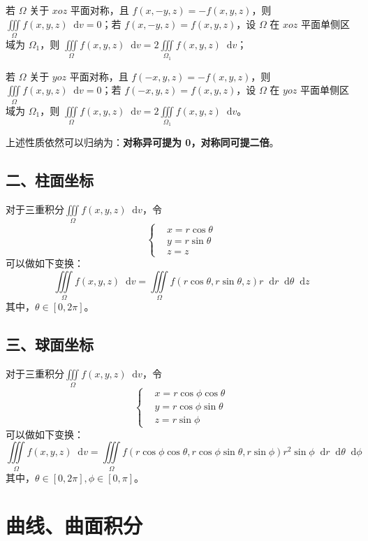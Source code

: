\documentclass[b5paper]{ctexart}
\renewcommand{\d}{\mathop{}\!\mathrm{d}}
\begin{document}
	若 $\Omega$ 关于 $xoz$ 平面对称，且 $f(x, -y, z) = -f(x, y, z)$，则 $\iiint \limits_{\Omega} f(x, y, z) \d v = 0$；若 $f(x, -y, z) = f(x, y, z)$，设 $\Omega$ 在 $xoz$ 平面单侧区域为 $\Omega_1$，则 $\iiint \limits_{\Omega} f(x, y, z) \d v = 2 \iiint \limits_{\Omega_1} f(x, y, z) \d v$；
	
	若 $\Omega$ 关于 $yoz$ 平面对称，且 $f(-x, y, z) = -f(x, y, z)$，则 $\iiint \limits_{\Omega} f(x, y, z) \d v = 0$；若 $f(-x, y, z) = f(x, y, z)$，设 $\Omega$ 在 $yoz$ 平面单侧区域为 $\Omega_1$，则 $\iiint \limits_{\Omega} f(x, y, z) \d v = 2 \iiint \limits_{\Omega_1} f(x, y, z) \d v$。
	
	上述性质依然可以归纳为：\textbf{对称异可提为 0，对称同可提二倍}。
	
	\subsection*{二、柱面坐标}
	对于三重积分$\iiint \limits_{\Omega} f(x, y, z) \d v$，令
	\[
		\left\{
		\begin{aligned}
			& x = r \cos \theta \\
			& y = r \sin \theta \\
			& z = z
		\end{aligned}
		\right.
	\]
	可以做如下变换：
	\[
	\iiint\limits_{\Omega} f(x, y, z) \d v = \iiint\limits_{\Omega} f(r \cos\theta, r \sin\theta, z) r \d r \d \theta \d z
	\]
	其中，$\theta \in [0, 2 \pi]$。
	
	\subsection*{三、球面坐标}
	对于三重积分$\iiint \limits_{\Omega} f(x, y, z) \d v$，令
	\[
	\left\{
	\begin{aligned}
		& x = r \cos \phi \cos \theta \\
		& y = r \cos \phi \sin \theta \\
		& z = r \sin \phi
	\end{aligned}
	\right.
	\]
	可以做如下变换：
	\[
	\iiint\limits_{\Omega} f(x, y, z) \d v = \iiint\limits_{\Omega} f(r \cos \phi \cos \theta, r \cos \phi \sin \theta, r \sin \phi) r^{2} \sin \phi \d r \d \theta \d \phi 
	\]
	其中，$\theta \in [0, 2 \pi], \phi \in [0, \pi]$。
	
	
	
	\newpage
	\section{曲线、曲面积分}
\end{document}
